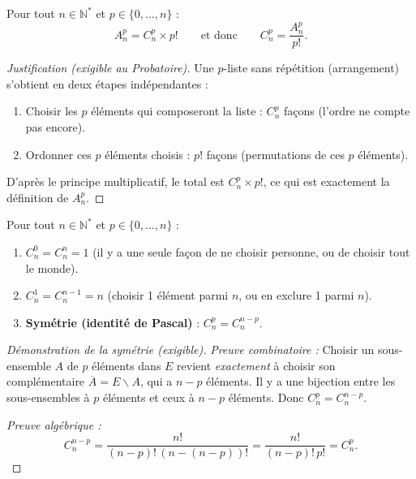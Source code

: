 \documentclass[11pt]{article}
\def\setminus{\mathbin{\backslash}}\let\smallsetminus\setminus
\begin{document}
\begin{propriete}
Pour tout $n \in \mathbb{N}^*$ et $p \in \{0, \dots, n\}$ :
\[
A_n^p = C_n^p \times p! \qquad \text{et donc} \qquad C_n^p = \frac{A_n^p}{p!}.
\]
\begin{proof}[Justification (exigible au Probatoire)]
Une $p$-liste sans répétition (arrangement) s'obtient en deux étapes indépendantes :
\begin{enumerate}
    \item Choisir les $p$ éléments qui composeront la liste : $C_n^p$ façons (l'ordre ne compte pas encore).
    \item Ordonner ces $p$ éléments choisis : $p!$ façons (permutations de ces $p$ éléments).
\end{enumerate}
D'après le principe multiplicatif, le total est $C_n^p \times p!$, ce qui est exactement la définition de $A_n^p$.
\end{proof}
\end{propriete}

\begin{propriete}
Pour tout $n \in \mathbb{N}^*$ et $p \in \{0, \dots, n\}$ :
\begin{enumerate}
    \item $C_n^0 = C_n^n = 1$ (il y a une seule façon de ne choisir personne, ou de choisir tout le monde).
    \item $C_n^1 = C_n^{n-1} = n$ (choisir 1 élément parmi $n$, ou en exclure 1 parmi $n$).
    \item \textbf{Symétrie (identité de Pascal)} : $\displaystyle C_n^p = C_n^{n-p}$.
\end{enumerate}
\end{propriete}

\begin{proof}[Démonstration de la symétrie (exigible)]
\emph{Preuve combinatoire :} Choisir un sous-ensemble $A$ de $p$ éléments dans $E$ revient \emph{exactement} à choisir son complémentaire $\overline{A} = E \setminus A$, qui a $n-p$ éléments. Il y a une bijection entre les sous-ensembles à $p$ éléments et ceux à $n-p$ éléments. Donc $C_n^p = C_n^{n-p}$.

\emph{Preuve algébrique :}
\[
C_n^{n-p} = \frac{n!}{(n-p)!\,(n-(n-p))!} = \frac{n!}{(n-p)!\,p!} = C_n^p.
\]
\end{proof}
\end{document}
